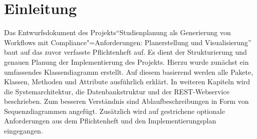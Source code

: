 \section{Einleitung}
Das Entwurfsdokument des Projekts\enquote{Studienplanung als Generierung von Workflows mit Compliance"=Anforderungen: Planerstellung und Visualisierung} baut auf das zuvor verfasste Pflichtenheft auf. Es dient der Strukturierung und genauen Planung der Implementierung des Projekts. Hierzu wurde zunächst ein umfassendes Klassendiagramm erstellt. Auf diesem basierend werden alle Pakete, Klassen, Methoden und Attribute ausführlich erklärt. In weiteren Kapiteln wird die Systemarchitektur, die Datenbankstruktur und der REST-Webservice beschrieben. Zum besseren Verständnis sind Ablaufbeschreibungen in Form von Sequenzdiagrammen angefügt. Zusätzlich wird auf gestrichene optionale Anforderungen aus dem Pflichtenheft und den Implementierungsplan eingegangen.



